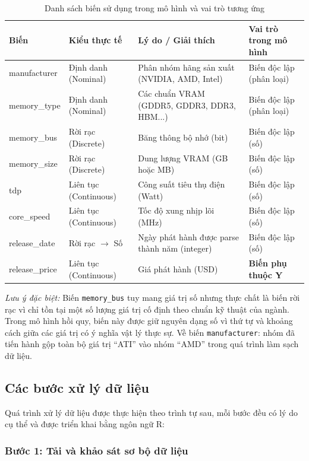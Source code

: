 \documentclass[a4paper]{article}
\begin{document}
\begin{table}[h!]
\centering
\caption{Danh sách biến sử dụng trong mô hình và vai trò tương ứng}
\label{tab:variables}
\begin{tabular}{|p{2.5cm}|p{2.5cm}|p{5cm}|p{3cm}|}
\hline
\textbf{Biến} & \textbf{Kiểu thực tế} & \textbf{Lý do / Giải thích} & \textbf{Vai trò trong mô hình} \\
\hline
manufacturer & Định danh (Nominal) & Phân nhóm hãng sản xuất (NVIDIA, AMD, Intel) & Biến độc lập (phân loại) \\
\hline
memory\_type & Định danh (Nominal) & Các chuẩn VRAM (GDDR5, GDDR3, DDR3, HBM...) & Biến độc lập (phân loại) \\
\hline
memory\_bus & Rời rạc (Discrete) & Băng thông bộ nhớ (bit) & Biến độc lập (số) \\
\hline
memory\_size & Rời rạc (Discrete) & Dung lượng VRAM (GB hoặc MB) & Biến độc lập (số) \\
\hline
tdp & Liên tục (Continuous) & Công suất tiêu thụ điện (Watt) & Biến độc lập (số) \\
\hline
core\_speed & Liên tục (Continuous) & Tốc độ xung nhịp lõi (MHz) & Biến độc lập (số) \\
\hline
release\_date & Rời rạc $\rightarrow$ Số & Ngày phát hành được parse thành năm (integer) & Biến độc lập (số) \\
\hline
release\_price & Liên tục (Continuous) & Giá phát hành (USD) & \textbf{Biến phụ thuộc Y} \\
\hline
\end{tabular}
\end{table}

\textit{Lưu ý đặc biệt:} Biến \texttt{memory\_bus} tuy mang giá trị số nhưng thực chất là biến rời rạc vì chỉ tồn tại một số lượng giá trị cố định theo chuẩn kỹ thuật của ngành. Trong mô hình hồi quy, biến này được giữ nguyên dạng số vì thứ tự và khoảng cách giữa các giá trị có ý nghĩa vật lý thực sự. Về biến \texttt{manufacturer}: nhóm đã tiến hành gộp toàn bộ giá trị ``ATI'' vào nhóm ``AMD'' trong quá trình làm sạch dữ liệu.

\subsection{Các bước xử lý dữ liệu}

Quá trình xử lý dữ liệu được thực hiện theo trình tự sau, mỗi bước đều có lý do cụ thể và được triển khai bằng ngôn ngữ R:

\subsubsection{Bước 1: Tải và khảo sát sơ bộ dữ liệu}
\end{document}
